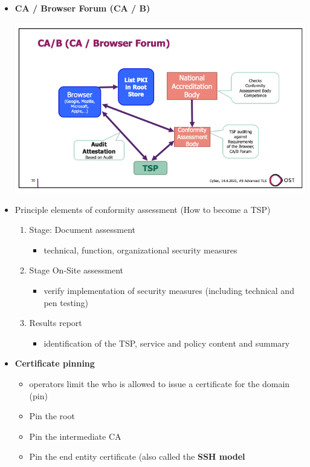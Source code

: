\documentclass[11pt,twoside,landscape]{article}
\begin{document}
\begin{multicols}{4}
\begin{itemize}
\item \textbf{CA / Browser Forum (CA / B)}
\begin{center}
\includegraphics[width=.9\linewidth]{static/img/cysec/ca_b.png}
\end{center}

\item Principle elements of conformity assessment (How to become a TSP)
\begin{enumerate}
\item Stage: Document assessment
\begin{itemize}
\item technical, function, organizational security measures
\end{itemize}
\item Stage On-Site assessment
\begin{itemize}
\item verify implementation of security measures (including technical and pen testing)
\end{itemize}
\item Results report
\begin{itemize}
\item identification of the TSP, service and policy content and summary
\end{itemize}
\end{enumerate}
\end{itemize}


\begin{itemize}
\item \textbf{Certificate pinning}
\begin{itemize}
\item operators limit the who is allowed to issue a certificate for the domain (pin)
\item Pin the root
\item Pin the intermediate CA
\item Pin the end entity certificate (also called the \textbf{SSH model}
\end{itemize}
\end{itemize}


\end{multicols}
\end{document}
